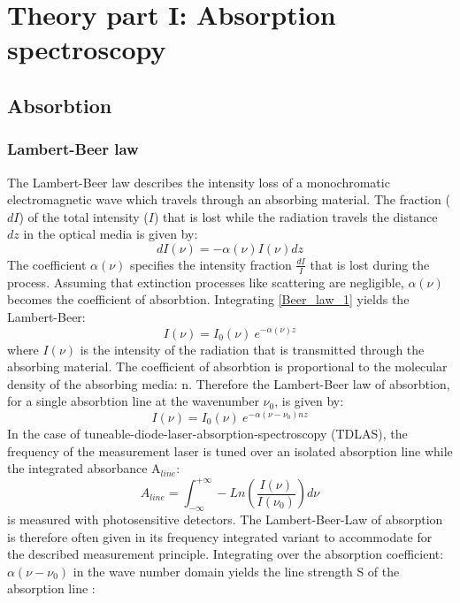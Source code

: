 
\chapter{Theory part I: Absorption spectroscopy}
\section{Absorbtion}
\subsection{Lambert-Beer law}
The Lambert-Beer law describes the intensity loss of a monochromatic electromagnetic wave which travels through an absorbing material. The fraction ($dI$) of the total intensity ($I$) that is lost while the radiation travels the distance $dz$ in the optical media is given by:
\begin{equation}
dI(\nu)=-\alpha(\nu) I(\nu) dz
\label{Beer_law_1}
\end{equation}
 The coefficient $\alpha(\nu)$ specifies the intensity fraction  $\frac{dI}{I}$ that is lost during the process. Assuming that extinction processes like scattering are negligible, $\alpha(\nu)$ becomes the coefficient of absorbtion. Integrating \eqref{Beer_law_1} yields the Lambert-Beer:
\begin{equation}
	I(\nu)=I_0(\nu) \ e^{-\alpha(\nu) z}
	\label{Beer_law}
\end{equation}
where $I(\nu)$ is the intensity of the radiation that is transmitted through the absorbing material. The coefficient of absorbtion is proportional to the molecular density of the absorbing media: n. Therefore the Lambert-Beer law of absorbtion, for a single absorbtion line at the wavenumber $\nu_0$, is given by:  
\begin{equation}
I(\nu)=I_0(\nu) \ e^{-\alpha(\nu-\nu_0) n z}
\label{Beer_law_2}
\end{equation}
In the case of tuneable-diode-laser-absorption-spectroscopy (TDLAS), the frequency of the measurement laser is tuned over an isolated absorption line while the integrated absorbance A$_{line}$:
\begin{equation}
A_{line}= \int_{-\infty}^{+\infty} -Ln\left(\frac{I(\nu)}{I(\nu_0)} \right)  d\nu
\label{Integrated_absorbance}
\end{equation}
is measured with photosensitive detectors. The Lambert-Beer-Law of absorption is therefore often given in its frequency integrated variant to accommodate for the described measurement principle. Integrating over the absorption coefficient: $\alpha(\nu-\nu_0)$ in the wave number domain yields the line strength S of the absorption line \cite{Padilla2007}:
